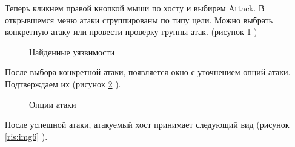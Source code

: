 \documentclass[10pt,a4paper]{report}
\begin{document}
Теперь кликнем правой кнопкой мыши по хосту и выбирем Attack. В открывшемся меню атаки сгруппированы по типу цели. Можно выбрать конкретную атаку или провести проверку группы атак. (рисунок \ref{ris:img4} ) \\
\begin{figure}[h]
\caption{Найденные уязвимости}
\label{ris:img4}  
\end{figure}
После выбора конкретной атаки, появляется окно с уточнением опций атаки. Подтверждаем их (рисунок \ref{ris:img5} ).\\
\begin{figure}[h]
\caption{Опции атаки}
\label{ris:img5}  
\end{figure}
После успешной атаки, атакуемый хост принимает следующий вид (рисунок \ref{ris:img6} ).\\
\end{document}
